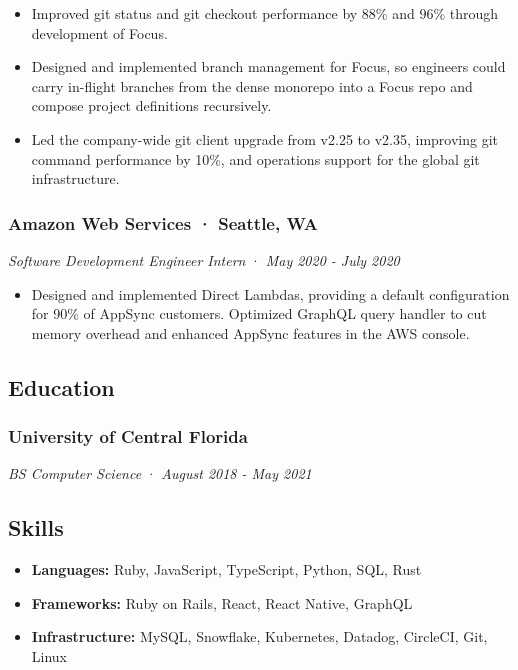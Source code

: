 \documentclass[
]{article}
\providecommand{\tightlist}{%
  \setlength{\itemsep}{0pt}\setlength{\parskip}{0pt}}
\begin{document}
\begin{itemize}
\tightlist
\item
  Improved git status and git checkout performance by 88\% and 96\%
  through development of Focus.
\item
  Designed and implemented branch management for Focus, so engineers
  could carry in-flight branches from the dense monorepo into a Focus
  repo and compose project definitions recursively.
\item
  Led the company-wide git client upgrade from v2.25 to v2.35, improving
  git command performance by 10\%, and operations support for the global
  git infrastructure.
\end{itemize}

\subsubsection{Amazon Web Services · Seattle,
WA}\label{amazon-web-services-seattle-wa}

\emph{Software Development Engineer Intern} · \emph{May 2020 - July
2020}

\begin{itemize}
\tightlist
\item
  Designed and implemented Direct Lambdas, providing a default
  configuration for 90\% of AppSync customers. Optimized GraphQL query
  handler to cut memory overhead and enhanced AppSync features in the
  AWS console.
\end{itemize}

\subsection{Education}\label{education}

\subsubsection{University of Central
Florida}\label{university-of-central-florida}

\emph{BS Computer Science} · \emph{August 2018 - May 2021}

\subsection{Skills}\label{skills}

\begin{itemize}
\tightlist
\item
  \textbf{Languages:} Ruby, JavaScript, TypeScript, Python, SQL, Rust
\item
  \textbf{Frameworks:} Ruby on Rails, React, React Native, GraphQL
\item
  \textbf{Infrastructure:} MySQL, Snowflake, Kubernetes, Datadog,
  CircleCI, Git, Linux
\end{itemize}
\end{document}
